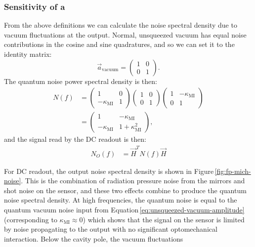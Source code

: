 \subsubsection{Sensitivity of a \FPMI{}}
From the above definitions we can calculate the noise spectral density due to vacuum fluctuations at the output. Normal, unsqueezed vacuum has equal noise contributions in the cosine and sine quadratures, and so we can set it to the identity matrix:
\begin{equation}
  \label{eq:unsqueezed-vacuum-amplitude}
  \vec{a}_{\text{vacuum}} =
  \begin{pmatrix}
   1 & 0 \\
   0 & 1
  \end{pmatrix}.
\end{equation}
The quantum noise power spectral density is then:
\begin{equation}
  \begin{split}
    N \left( f \right) &=
    \begin{pmatrix}
      1 & 0 \\
      -\kappa_{\text{MI}} & 1
    \end{pmatrix}
    \begin{pmatrix}
      1 & 0 \\
      0 & 1
    \end{pmatrix}
    \begin{pmatrix}
      1 & -\kappa_{\text{MI}} \\
      0 & 1
    \end{pmatrix} \\
    &=
    \begin{pmatrix}
      1 & -\kappa_{\text{MI}} \\
      -\kappa_{\text{MI}} & 1 + \kappa^2_{\text{MI}}
    \end{pmatrix},
  \end{split}
\end{equation}
and the signal read by the \gls{DC} readout is then:
\begin{equation}
  \begin{split}
    N_O \left( f \right) &= \vec{H}^{T} N \left( f \right) \vec{H}
  \end{split}
\end{equation}

For \gls{DC} readout, the output noise spectral density is shown in Figure\,\ref{fig:fp-mich-noise}. This is the combination of radiation pressure noise from the mirrors and shot noise on the sensor, and these two effects combine to produce the quantum noise spectral density. At high frequencies, the quantum noise is equal to the quantum vacuum noise input from Equation\,\ref{eq:unsqueezed-vacuum-amplitude} (corresponding to $\kappa_{\text{MI}} \approx 0$) which shows that the signal on the sensor is limited by noise propagating to the output with no significant optomechanical interaction. Below the cavity pole, the vacuum fluctuations 

